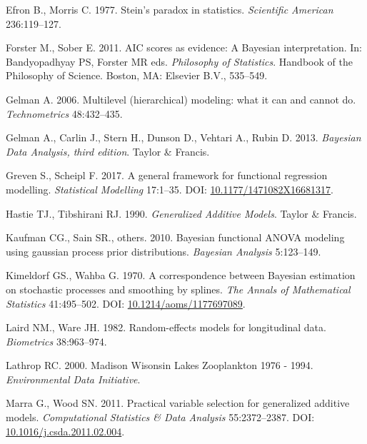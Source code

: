 \documentclass[12pt]{article}
\begin{document}
\hypertarget{ref-efron_steins_1977}{}
Efron B., Morris C. 1977. Stein's paradox in statistics.
\emph{Scientific American} 236:119--127.

\hypertarget{ref-forster_aic_2011}{}
Forster M., Sober E. 2011. AIC scores as evidence: A Bayesian
interpretation. In: Bandyopadhyay PS, Forster MR eds. \emph{Philosophy
of Statistics}. Handbook of the Philosophy of Science. Boston, MA:
Elsevier B.V., 535--549.

\hypertarget{ref-Gelman:2006jh}{}
Gelman A. 2006. Multilevel (hierarchical) modeling: what it can and
cannot do. \emph{Technometrics} 48:432--435.

\hypertarget{ref-gelman2013bayesian}{}
Gelman A., Carlin J., Stern H., Dunson D., Vehtari A., Rubin D. 2013.
\emph{Bayesian Data Analysis, third edition}. Taylor \& Francis.

\hypertarget{ref-greven_general_2017}{}
Greven S., Scheipl F. 2017. A general framework for functional
regression modelling. \emph{Statistical Modelling} 17:1--35. DOI:
\href{https://doi.org/10.1177/1471082X16681317}{10.1177/1471082X16681317}.

\hypertarget{ref-Hastie:1990vg}{}
Hastie TJ., Tibshirani RJ. 1990. \emph{Generalized Additive Models}.
Taylor \& Francis.

\hypertarget{ref-kaufman_bayesian_2010}{}
Kaufman CG., Sain SR., others. 2010. Bayesian functional ANOVA modeling
using gaussian process prior distributions. \emph{Bayesian Analysis}
5:123--149.

\hypertarget{ref-kimeldorf_correspondence_1970}{}
Kimeldorf GS., Wahba G. 1970. A correspondence between Bayesian
estimation on stochastic processes and smoothing by splines. \emph{The
Annals of Mathematical Statistics} 41:495--502. DOI:
\href{https://doi.org/10.1214/aoms/1177697089}{10.1214/aoms/1177697089}.

\hypertarget{ref-laird_random-effects_1982}{}
Laird NM., Ware JH. 1982. Random-effects models for longitudinal data.
\emph{Biometrics} 38:963--974.

\hypertarget{ref-lathrop_madison_2000}{}
Lathrop RC. 2000. Madison Wisonsin Lakes Zooplankton 1976 - 1994.
\emph{Environmental Data Initiative}.

\hypertarget{ref-marra_practical_2011}{}
Marra G., Wood SN. 2011. Practical variable selection for generalized
additive models. \emph{Computational Statistics \& Data Analysis}
55:2372--2387. DOI:
\href{https://doi.org/10.1016/j.csda.2011.02.004}{10.1016/j.csda.2011.02.004}.
\end{document}

